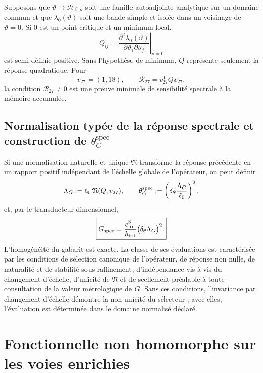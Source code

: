 Supposons que
\(\vartheta\mapsto\mathcal H_{\beta,\vartheta}\) soit une famille
autoadjointe analytique sur un domaine commun et que
\(\lambda_0(\vartheta)\) soit une bande simple et isolée dans un voisinage de
\(\vartheta=0\). Si \(0\) est un point critique et un minimum local,
\[
 Q_{ij}
 =
 \left.
 \frac{\partial^2\lambda_0(\vartheta)}
      {\partial\vartheta_i\partial\vartheta_j}
 \right|_{\vartheta=0}
\]
est semi-définie positive. Sans l'hypothèse de minimum, \(Q\) représente seulement
la réponse quadratique. Pour
\[
 v_{27}=(1,18),
 \qquad
 \mathcal R_{27}=v_{27}^{\mathsf T}Qv_{27},
\]
la condition \(\mathcal R_{27}\neq0\) est une preuve minimale de sensibilité
spectrale à la mémoire accumulée.

\subsection{Normalisation typée de la réponse spectrale et construction de \texorpdfstring{\(\theta_G^{\mathrm{spec}}\)}{theta G spec}}

Si une normalisation naturelle et unique \(\mathfrak N\) transforme la réponse
précédente en un rapport positif indépendant de l'échelle globale de
l'opérateur, on peut définir
\[
 \Lambda_G
 :=\ell_0\,\mathfrak N(Q,v_{27}),
 \qquad
 \theta_G^{\rm spec}
 :=
 \left(
 \delta_\theta\frac{\Lambda_G}{\ell_0}
 \right)^2,
\]
et, par le transducteur dimensionnel,
\[
 \boxed{
 G_{\rm spec}
 =
 \frac{c_{\rm int}^{3}}{\hbar_{\rm int}}
 \bigl(\delta_\theta\Lambda_G\bigr)^2.}
\]
L'homogénéité du gabarit est exacte. La classe de ses évaluations est
caractérisée par les conditions de sélection canonique de l'opérateur,
de réponse non nulle, de naturalité et de stabilité sous raffinement, d'indépendance
vis-à-vis du changement d'échelle, d'unicité de \(\mathfrak N\) et de scellement préalable à toute consultation
de la valeur métrologique de \(G\). Sans ces conditions, l'invariance par
changement d'échelle démontre la non-unicité du sélecteur ; avec elles, l'évaluation est
déterminée dans le domaine normalisé déclaré.

\section{Fonctionnelle non homomorphe sur les voies enrichies}
\label{sec:funcional-longitud-K27-G}

